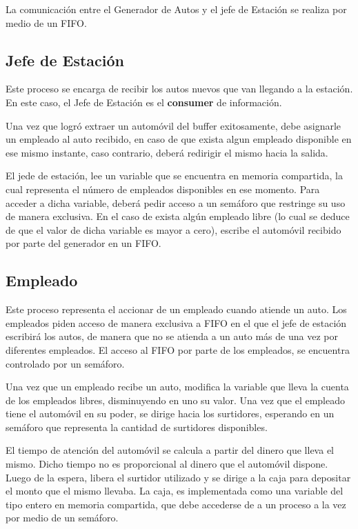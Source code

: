 \documentclass[12pt,a4paper,spanish]{article}
\begin{document}
		La comunicación entre el Generador de Autos y el jefe de Estación se realiza por medio de un
		FIFO.


	\subsection{Jefe de Estación}
		Este proceso se encarga de recibir los autos nuevos que van llegando a la estación. 
		En este caso, el Jefe de Estación es el \textbf{consumer} de información.

		Una vez que logró extraer un automóvil del buffer exitosamente, debe asignarle 
		un empleado al auto recibido, en caso de que exista algun empleado disponible 
		en ese mismo instante, caso contrario, deberá redirigir el mismo hacia la salida.
		
		El jede de estación, lee un variable que se encuentra en memoria compartida, la cual
		representa el número de empleados disponibles en ese momento. Para acceder a dicha variable,
		deberá pedir acceso a un semáforo que restringe su uso de manera exclusiva.
		En el caso de exista algún empleado libre (lo cual se deduce de que el valor de dicha variable
		es mayor a cero), escribe el automóvil recibido por parte del generador en un FIFO.


	\subsection{Empleado}
	
		Este proceso representa el accionar de un empleado cuando atiende un auto. Los empleados piden acceso
		de manera exclusiva a FIFO en el que el jefe de estación escribirá los autos, de manera que no se
		atienda a un auto más de una vez por diferentes empleados. El acceso al FIFO por parte de los empleados,
		se encuentra controlado por un semáforo. 

		Una vez que un empleado recibe un auto, modifica la variable que lleva la cuenta de los empleados libres, 
		disminuyendo en uno su valor. Una vez que el empleado tiene el automóvil en su poder, se dirige hacia los
		surtidores, esperando en un semáforo que representa la cantidad de surtidores disponibles. 

		El tiempo de atención del automóvil se calcula a partir del dinero que lleva el mismo. Dicho tiempo no es
		proporcional al dinero que el automóvil dispone. Luego de la espera, libera el surtidor utilizado y se dirige
		a la caja para depositar el monto que el mismo llevaba. La caja, es implementada como una variable del tipo entero
		en memoria compartida, que debe accederse de a un proceso a la vez por medio de un semáforo.
\end{document}
